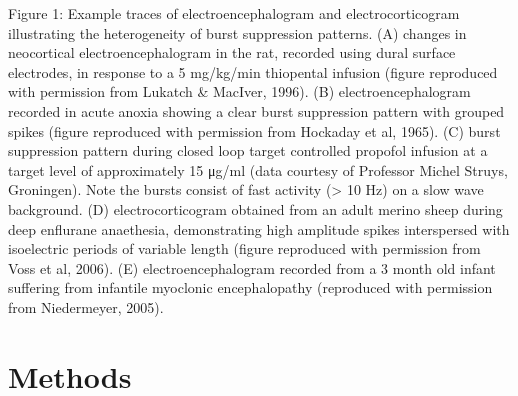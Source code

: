 \documentclass[a4paper,12pt]{article}
\begin{document}
Figure 1: Example traces of electroencephalogram and
electrocorticogram illustrating the heterogeneity of burst suppression
patterns. (A) changes in neocortical electroencephalogram in the rat,
recorded using dural surface electrodes, in response to a 5 mg/kg/min
thiopental infusion (figure reproduced with permission from Lukatch \&
MacIver, 1996). (B) electroencephalogram recorded in acute anoxia
showing a clear burst suppression pattern with grouped spikes (figure
reproduced with permission from Hockaday et al, 1965). (C) burst
suppression pattern during closed loop target controlled propofol
infusion at a target level of approximately 15 μg/ml (data courtesy of
Professor Michel Struys, Groningen). Note the bursts consist of fast
activity (> 10 Hz) on a slow wave background. (D) electrocorticogram
obtained from an adult merino sheep during deep enflurane anaethesia,
demonstrating high amplitude spikes interspersed with isoelectric
periods of variable length (figure reproduced with permission from
Voss et al, 2006). (E) electroencephalogram recorded from a 3 month
old infant suffering from infantile myoclonic encephalopathy
(reproduced with permission from Niedermeyer, 2005).

\section{Methods}
\end{document}
